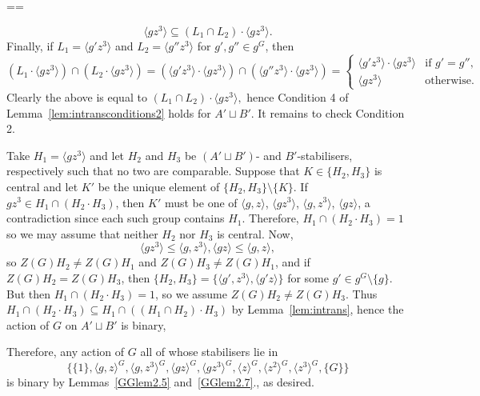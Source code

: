 \documentclass[11pt, a4paper]{amsart}
\makeatletter
\renewcommand{\proofname}{Proof}
\renewenvironment{proof}[1][\proofname]{\par
  \pushQED{\qed}  \normalfont \partopsep=\z@skip \topsep=\z@skip
  \trivlist
  \item[\hskip\labelsep
        \scshape
    #1\@addpunct{.}]\ignorespaces
}{  \popQED\endtrivlist\@endpefalse
}
\makeatother
\begin{document}
\begin{proof}
$$    \langle gz^3\rangle\subseteq (L_1\cap L_2)\cdot \langle gz^3\rangle.$$ Finally, if $L_1=\langle g'z^3\rangle$ and $L_2=\langle g''z^3\rangle$ for $g',g''\in g^G$, then 
    $$(L_1\cdot\langle gz^3\rangle)\cap (L_2\cdot\langle gz^3\rangle)=(\langle g'z^3\rangle\cdot \langle gz^3\rangle)\cap( \langle g''z^3\rangle\cdot\langle gz^3\rangle)=\begin{cases}
        \langle g'z^3\rangle\cdot \langle gz^3\rangle&\text{if $g'=g''$,}\\
        \langle gz^3\rangle &\text{otherwise}.
    \end{cases}$$
    Clearly the above is equal to $(L_1\cap L_2)\cdot \langle gz^3\rangle,$ hence Condition 4 of Lemma~\ref{lem:intransconditions2} holds for $A'\sqcup B'$. It remains to check Condition 2.

    Take $H_1=\langle gz^3\rangle$ and let $H_2$ and $H_3$ be $(A'\sqcup B')$- and $B'$-stabilisers, respectively such that no two are comparable. Suppose that $K\in\{H_2,H_3\}$ is central and let $K'$ be the unique element of $\{H_2,H_3\}\setminus\{K\}$. If $gz^3\in H_1\cap (H_2\cdot H_3)$, then $K'$ must be one of $\langle g,z\rangle$, $\langle gz^3\rangle$, $\langle g,z^3\rangle$, $\langle gz\rangle$, a contradiction since each such group contains $H_1$. Therefore, $H_1\cap (H_2\cdot H_3)=1$ so we may assume that neither $H_2$ nor $H_3$ is central.     Now, $$\langle gz^3\rangle\leq\langle g,z^3\rangle,\langle gz\rangle\leq \langle g,z\rangle,$$ so $Z(G)H_2\ne Z(G)H_1$ and $Z(G)H_3\ne Z(G)H_1$, and if $Z(G)H_2= Z(G)H_3$, then $\{H_2,H_3\}=\{\langle g',z^3\rangle,\langle g'z\rangle\}$ for some $g'\in g^G\setminus\{g\}$. But then $H_1\cap(H_2\cdot H_3)=1 $, so we assume $Z(G)H_2\ne Z(G)H_3$. Thus $H_1\cap(H_2\cdot H_3)\subseteq H_1\cap((H_1\cap H_2)\cdot H_3)$ by Lemma~\ref{lem:intrans}, hence the action of $G$ on $A'\sqcup B'$ is binary,

Therefore, any action of $G$ all of whose stabilisers lie in $$\{\{1\},\langle g,z\rangle^G,\langle g,z^3\rangle^G,\langle gz\rangle^G,\langle gz^3\rangle^G,\langle z\rangle^G,\langle z^2\rangle^G,\langle z^3\rangle^G,\{G\}\}$$ is binary by Lemmas~\ref{GGlem2.5} and~\ref{GGlem2.7}., as desired.
                                   \end{proof}
  
                 
        
   
      
  
    
             
        
\end{document}
